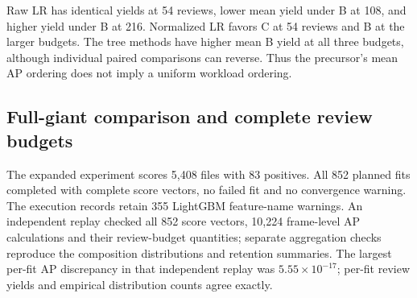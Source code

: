 \documentclass[preprint,12pt]{elsarticle}
\begin{document}
Raw LR has identical yields at 54 reviews, lower mean yield under B at 108, and higher yield under B at 216. Normalized LR favors C at 54 reviews and B at the larger budgets. The tree methods have higher mean B yield at all three budgets, although individual paired comparisons can reverse. Thus the precursor's mean AP ordering does not imply a uniform workload ordering.

\subsection{Full-giant comparison and complete review budgets}\label{full-giant-comparison-and-complete-review-budgets}

The expanded experiment scores 5,408 files with 83 positives. All 852 planned fits completed with complete score vectors, no failed fit and no convergence warning. The execution records retain 355 LightGBM feature-name warnings. An independent replay checked all 852 score vectors, 10,224 frame-level AP calculations and their review-budget quantities; separate aggregation checks reproduce the composition distributions and retention summaries. The largest per-fit AP discrepancy in that independent replay was \(5.55\times10^{-17}\); per-fit review yields and empirical distribution counts agree exactly.
\end{document}

